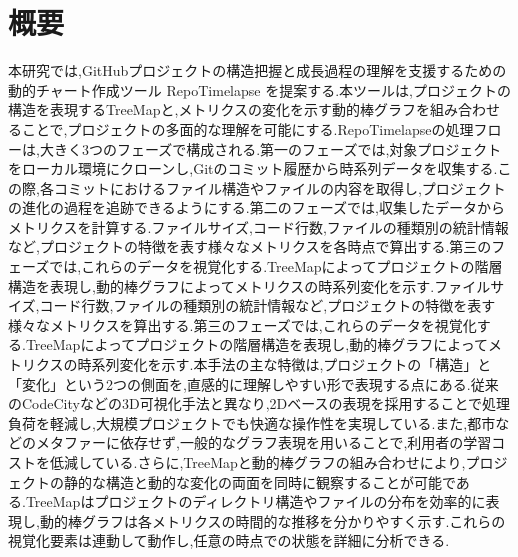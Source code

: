 \documentclass[12pt,twoside]{jbook}
\begin{document}
\section{概要}
本研究では,GitHubプロジェクトの構造把握と成長過程の理解を支援するための動的チャート作成ツール RepoTimelapse を提案する.本ツールは,プロジェクトの構造を表現するTreeMapと,メトリクスの変化を示す動的棒グラフを組み合わせることで,プロジェクトの多面的な理解を可能にする.RepoTimelapseの処理フローは,大きく3つのフェーズで構成される.第一のフェーズでは,対象プロジェクトをローカル環境にクローンし,Gitのコミット履歴から時系列データを収集する.この際,各コミットにおけるファイル構造やファイルの内容を取得し,プロジェクトの進化の過程を追跡できるようにする.第二のフェーズでは,収集したデータからメトリクスを計算する.ファイルサイズ,コード行数,ファイルの種類別の統計情報など,プロジェクトの特徴を表す様々なメトリクスを各時点で算出する.第三のフェーズでは,これらのデータを視覚化する.TreeMapによってプロジェクトの階層構造を表現し,動的棒グラフによってメトリクスの時系列変化を示す.ファイルサイズ,コード行数,ファイルの種類別の統計情報など,プロジェクトの特徴を表す様々なメトリクスを算出する.第三のフェーズでは,これらのデータを視覚化する.TreeMapによってプロジェクトの階層構造を表現し,動的棒グラフによってメトリクスの時系列変化を示す.本手法の主な特徴は,プロジェクトの「構造」と「変化」という2つの側面を,直感的に理解しやすい形で表現する点にある.従来のCodeCityなどの3D可視化手法と異なり,2Dベースの表現を採用することで処理負荷を軽減し,大規模プロジェクトでも快適な操作性を実現している.また,都市などのメタファーに依存せず,一般的なグラフ表現を用いることで,利用者の学習コストを低減している.さらに,TreeMapと動的棒グラフの組み合わせにより,プロジェクトの静的な構造と動的な変化の両面を同時に観察することが可能である.TreeMapはプロジェクトのディレクトリ構造やファイルの分布を効率的に表現し,動的棒グラフは各メトリクスの時間的な推移を分かりやすく示す.これらの視覚化要素は連動して動作し,任意の時点での状態を詳細に分析できる.
\end{document}
